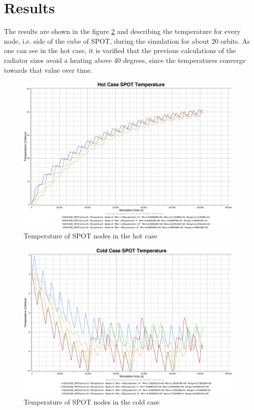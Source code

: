 \section{Results}
The results are shown in the figure \ref{fig:spothot} and describing the temperature for every node, i.e. side of the cube of SPOT, during the simulation for about 20 orbits. As one can see in the hot case, it is varified that the previous calculations of the radiator sizes avoid a heating above 40 degrees, since the temperatures converge towards that value over time. 
\begin{figure}[H]
	\centering
	\includegraphics[scale=0.15]{images/SPOT_hotcase_temperature.png}
	\caption{Temperature of SPOT nodes in the hot case}
	\label{fig:spothot}
\end{figure}

\begin{figure}[H]
	\centering
	\includegraphics[scale=0.15]{images/SPOT_coldcase_temperature.png}
	\caption{Temperature of SPOT nodes in the cold case}
	\label{fig:spothot}
\end{figure}


